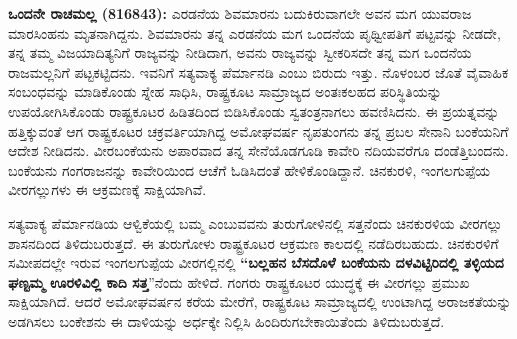 \textbf{ಒಂದನೇ ರಾಚಮಲ್ಲ (816\general{\enginline{-}}843):} ಎರಡನೆಯ ಶಿವಮಾರನು ಬದುಕಿರುವಾಗಲೇ ಅವನ ಮಗ ಯುವರಾಜ ಮಾರಸಿಂಹನು ಮೃತನಾಗಿದ್ದನು. ಶಿವಮಾರನು ತನ್ನ ಎರಡನೆಯ ಮಗ ಒಂದನೆಯ ಪೃಥ್ವೀಪತಿಗೆ ಪಟ್ಟವನ್ನು ನೀಡದೇ, ತನ್ನ ತಮ್ಮ ವಿಜಯಾದಿತ್ಯನಿಗೆ ರಾಜ್ಯವನ್ನು ನೀಡಿದಾಗ, ಅವನು ರಾಜ್ಯವನ್ನು ಸ್ವೀಕರಿಸದೇ ತನ್ನ ಮಗ ಒಂದನೆಯ ರಾಜಮಲ್ಲನಿಗೆ ಪಟ್ಟಕಟ್ಟಿದನು. ಇವನಿಗೆ ಸತ್ಯವಾಕ್ಯ ಪೆರ್ಮಾನಡಿ ಎಂಬು ಬಿರುದು ಇತ್ತು. ನೊಳಂಬರ ಜೊತೆ ವೈವಾಹಿಕ ಸಂಬಂಧವನ್ನು ಮಾಡಿಕೊಂಡು ಸ್ನೇಹ ಸಾಧಿಸಿ, ರಾಷ್ಟ್ರಕೂಟ ಸಾಮ್ರಾಜ್ಯದ ಅಂತಃಕಲಹದ ಪರಿಸ್ಥಿತಿಯನ್ನು ಉಪಯೋಗಿಸಿಕೊಂಡು ರಾಷ್ಟ್ರಕೂಟರ ಹಿಡಿತದಿಂದ ಬಿಡಿಸಿಕೊಂಡು ಸ್ವತಂತ್ರನಾಗಲು ಹವಣಿಸಿದನು. ಈ ಪ್ರಯತ್ನವನ್ನು ಹತ್ತಿಕ್ಕುವಂತೆ ಆಗ ರಾಷ್ಟ್ರಕೂಟರ ಚಕ್ರವರ್ತಿಯಾಗಿದ್ದ ಅಮೋಘವರ್ಷ ನೃಪತುಂಗನು ತನ್ನ ಪ್ರಬಲ ಸೇನಾನಿ ಬಂಕೆಯನಿಗೆ ಆದೇಶ ನೀಡಿದನು. ವೀರಬಂಕೆಯನು ಅಪಾರವಾದ ತನ್ನ ಸೇನೆಯೊಡಗೂಡಿ ಕಾವೇರಿ ನದಿಯವರೆಗೂ ದಂಡೆತ್ತಿಬಂದನು. ಬಂಕೆಯನು ಗಂಗರಾಜನನ್ನು ಕಾವೇರಿಯಿಂದ ಆಚೆಗೆ ಓಡಿಸಿದಂತೆ ಹೇಳಿಕೊಂಡಿದ್ದಾನೆ. ಚಿನಕುರಳಿ, ಇಂಗಲಗುಪ್ಪೆಯ ವೀರಗಲ್ಲುಗಳು ಈ ಆಕ್ರಮಣಕ್ಕೆ ಸಾಕ್ಷಿಯಾಗಿವೆ.

ಸತ್ಯವಾಕ್ಯ ಪೆರ್ಮಾನಡಿಯ ಆಳ್ವಿಕೆಯಲ್ಲಿ ಬಮ್ಮ ಎಂಬುವವನು ತುರುಗೋಳಿನಲ್ಲಿ ಸತ್ತನೆಂದು ಚಿನಕುರಳಿಯ ವೀರಗಲ್ಲು ಶಾಸನದಿಂದ ತಿಳಿದುಬರುತ್ತದೆ. ಈ ತುರುಗೋಳು ರಾಷ್ಟ್ರಕೂಟರ ಆಕ್ರಮಣ ಕಾಲದಲ್ಲಿ ನಡೆದಿರಬಹುದು. ಚಿನಕುರಳಿಗೆ ಸಮೀಪದಲ್ಲೇ ಇರುವ ಇಂಗಲಗುಪ್ಪೆಯ ವೀರಗಲ್ಲಿನಲ್ಲಿ \textbf{“ಬಲ್ಲಹನ ಬೆಸದೊಳೆ ಬಂಕೆಯನು ದಳವಿಟ್ಟಿರಿದಲ್ಲಿ ತಳ್ಳಿಯದ ಘಣ್ಟಮ್ಮ ಊರಳಿವಿಲ್ಲಿ ಕಾದಿ ಸತ್ತ}”ನೆಂದು ಹೇಳಿದೆ. ಗಂಗರು ರಾಷ್ಟ್ರಕೂಟರ ಯುದ್ಧಕ್ಕೆ ಈ ವೀರಗಲ್ಲು ಪ್ರಮುಖ ಸಾಕ್ಷಿಯಾಗಿದೆ. ಆದರೆ ಅಮೋಘವರ್ಷನ ಕರೆಯ ಮೇರೆಗೆ, ರಾಷ್ಟ್ರಕೂಟ ಸಾಮ್ರಾಜ್ಯದಲ್ಲಿ ಉಂಟಾಗಿದ್ದ ಅರಾಜಕತೆಯನ್ನು ಅಡಗಿಸಲು ಬಂಕೇಶನು ಈ ದಾಳಿಯನ್ನು ಅರ್ಧಕ್ಕೇ ನಿಲ್ಲಿಸಿ ಹಿಂದಿರುಗಬೇಕಾಯಿತೆಂದು ತಿಳಿದುಬರುತ್ತದೆ.

